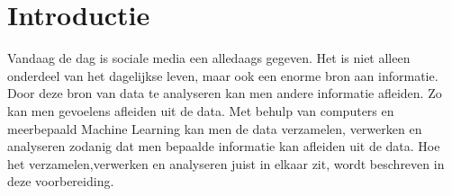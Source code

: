 \chapter{Introductie}\label{introductie}
Vandaag de dag is sociale media een alledaags gegeven. Het is niet alleen onderdeel van het dagelijkse leven, maar ook een enorme bron aan informatie.
Door deze bron van data te analyseren kan men andere informatie afleiden. Zo kan men gevoelens afleiden uit de data. Met behulp van computers en meerbepaald Machine Learning kan men de data verzamelen, verwerken en analyseren zodanig dat men bepaalde informatie kan afleiden uit de data.
Hoe het verzamelen,verwerken en analyseren juist in elkaar zit, wordt beschreven in deze voorbereiding.
